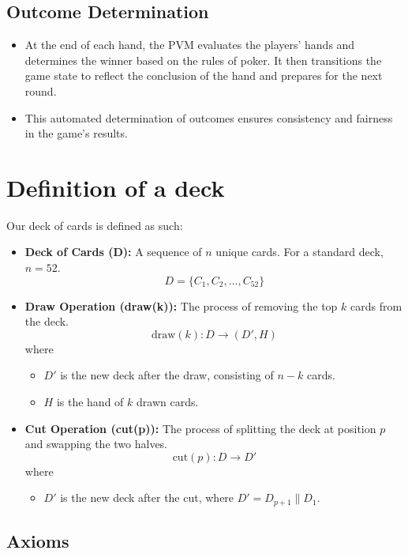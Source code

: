 \documentclass{article}
\begin{document}
\subsection{Outcome Determination}
\begin{itemize}
    \item At the end of each hand, the PVM evaluates the players' hands and determines the winner based on the rules of poker. It then transitions the game state to reflect the conclusion of the hand and prepares for the next round.
    \item This automated determination of outcomes ensures consistency and fairness in the game's results.
\end{itemize}

\section{Definition of a deck}

Our deck of cards is defined as such:

\begin{itemize}
    \item \textbf{Deck of Cards (D):} A sequence of \( n \) unique cards. For a standard deck, \( n = 52 \).
    \[
    D = \{C_1, C_2, \ldots, C_{52}\}
    \]

    \item \textbf{Draw Operation (draw(k)):} The process of removing the top \( k \) cards from the deck.
    \[
    \text{draw}(k) : D \rightarrow (D', H)
    \]
    where
    \begin{itemize}
        \item \( D' \) is the new deck after the draw, consisting of \( n-k \) cards.
        \item \( H \) is the hand of \( k \) drawn cards.
    \end{itemize}

    \item \textbf{Cut Operation (cut(p)):} The process of splitting the deck at position \( p \) and swapping the two halves.
    \[
    \text{cut}(p) : D \rightarrow D'
    \]
    where
    \begin{itemize}
        \item \( D' \) is the new deck after the cut, where \( D' = D_{p+1} \| D_1 \).
    \end{itemize}
\end{itemize}

\subsection*{Axioms}
\end{document}
